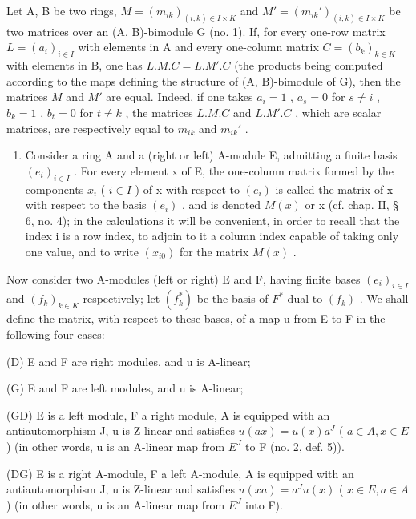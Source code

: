 Let A, B be two rings, \(M = (m_{ik})_{(i,k) \in I \times K}\) and \(M' = (m_{ik}')_{(i,k) \in I \times K}\) be two matrices over an (A, B)-bimodule G (no. 1). If, for every one-row matrix \(L = (a_i)_{i \in I}\) with elements in A and every one-column matrix \(C = (b_k)_{k \in K}\) with elements in B, one has \(L.M.C = L.M'.C\) (the products being computed according to the maps defining the structure of (A, B)-bimodule of G), then the matrices \(M\) and \(M'\) are equal. Indeed, if one takes \(a_i = 1\) , \(a_s = 0\) for \(s \neq i\) , \(b_k = 1\) , \(b_t = 0\) for \(t \neq k\) , the matrices \(L.M.C\) and \(L.M'.C\) , which are scalar matrices, are respectively equal to \(m_{ik}\) and \(m_{ik}'\) .

\begin{enumerate}
\def\labelenumi{\Roman{enumi}.}
\setcounter{enumi}{1}
\tightlist
\item
  Consider a ring A and a (right or left) A-module E, admitting a finite basis \((e_{i})_{i\in I}\) . For every element x of E, the one-column matrix formed by the components \(x_{i}\) ( \(i\in I\) ) of x with respect to \((e_{i})\) is called the matrix of x with respect to the basis \((e_{i})\) , and is denoted \(M(x)\) or x (cf. chap. II, § 6, no. 4); in the calculations it will be convenient, in order to recall that the index i is a row index, to adjoin to it a column index capable of taking only one value, and to write \((x_{i0})\) for the matrix \(M(x)\) .
\end{enumerate}

Now consider two A-modules (left or right) E and F, having finite bases \((e_{i})_{i\in I}\) and \((f_{k})_{k\in K}\) respectively; let \((f_{k}^{*})\) be the basis of \(F^{*}\) dual to \((f_{k})\) . We shall define the matrix, with respect to these bases, of a map u from E to F in the following four cases:

(D) E and F are right modules, and u is A-linear;

(G) E and F are left modules, and u is A-linear;

(GD) E is a left module, F a right module, A is equipped with an antiautomorphism J, u is Z-linear and satisfies \(u(ax) = u(x)a^{J}\) ( \(a \in A, x \in E\) ) (in other words, u is an A-linear map from \(E^{J}\) to F (no. 2, def. 5)).

(DG) E is a right A-module, F a left A-module, A is equipped with an antiautomorphism J, u is Z-linear and satisfies \(u(xa) = a^{J}u(x)\) ( \(x \in E, a \in A\) ) (in other words, u is an A-linear map from \(E^{J}\) into F).

